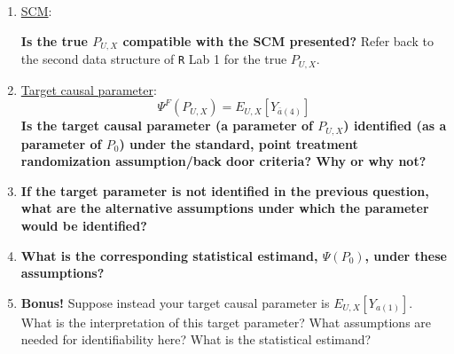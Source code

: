 \documentclass{exam}
\newenvironment{packed_item}{
\begin{itemize}
 \setlength{\itemsep}{0pt}
  \setlength{\parskip}{0pt}
  \setlength{\parsep}{0pt}
}{\end{itemize}}
\begin{document}
\begin{enumerate}
\item \underline{SCM}:
\textbf{Is the true $P_{U,X}$ compatible with the SCM presented?} Refer back to the second data structure of \texttt{R} Lab 1 for the true $P_{U,X}$.
\item \underline{Target causal parameter}:
\[
\Psi^F(P_{U,X}) = E_{U,X}[Y_{\bar{a}(4)}]
\]
\textbf{Is the target causal parameter (a parameter of $P_{U,X}$) identified (as a parameter of $P_0$) under the standard, point treatment randomization assumption/back door criteria? Why or why not?}
\item \textbf{If the target parameter is not identified in the previous question, what are the alternative assumptions under which the parameter would be identified?}
\item \textbf{What is the corresponding statistical estimand, $\Psi(P_0)$, under these assumptions?}
\item \textbf{Bonus!} Suppose instead your target causal parameter is $E_{U,X}[Y_{a(1)}]$. What is the interpretation of this target parameter? What assumptions are needed for identifiability here? What is the statistical estimand?
\end{enumerate}
\end{document}
